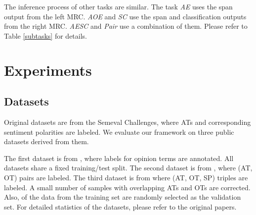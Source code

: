 \documentclass[letterpaper]{article} \usepackage{aaai21}  \usepackage{times}  \usepackage{helvet} \usepackage{courier}  \usepackage[hyphens]{url}  \usepackage{graphicx} \urlstyle{rm} \def\UrlFont{\rm}  \usepackage{natbib}  \usepackage{caption}
\begin{document}
The inference process of other tasks are similar. The task \emph{AE} uses the span output from the left MRC. 
\emph{AOE} and \emph{SC} use the span and classification outputs from the right MRC. 
\emph{AESC} and \emph{Pair} use a combination of them. 
Please refer to Table \ref{subtasks} for details.


\section{Experiments}
\subsection{Datasets}
Original datasets are from the Semeval Challenges\cite{pontiki-etal-2014-semeval, pontiki-etal-2015-semeval, pontiki-etal-2016-semeval}, where ATs and corresponding sentiment polarities are labeled. 
We evaluate our framework on three public datasets derived from them.


The first dataset is from \cite{DBLP:conf/aaai/WangPDX17}, where labels for opinion terms are annotated. All datasets share a fixed training/test split. 
 The second dataset is from \cite{fan2019target}, where (AT, OT) pairs are labeled. 
The third dataset is from \cite{peng2020knowing} where (AT, OT, SP) triples are labeled. 
A small number of samples with overlapping ATs and OTs are corrected. 
Also,  of the data from the training set are randomly selected as the validation set. 
For detailed statistics of the datasets, please refer to the original papers.
\end{document}
